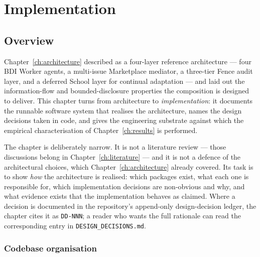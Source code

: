 \chapter{Implementation}
\label{ch:implementation}

\section{Overview}
\label{sec:impl-overview}

Chapter~\ref{ch:architecture} described \NEXUS{} as a four-layer
reference architecture --- four BDI Worker agents, a multi-issue
Marketplace mediator, a three-tier Fence audit layer, and a deferred
School layer for continual adaptation --- and laid out the
information-flow and bounded-disclosure properties the composition is
designed to deliver. This chapter turns from architecture to
\emph{implementation}: it documents the runnable software system that
realises the architecture, names the design decisions taken in code,
and gives the engineering substrate against which the empirical
characterisation of Chapter~\ref{ch:results} is performed.

The chapter is deliberately narrow. It is not a literature review ---
those discussions belong in Chapter~\ref{ch:literature} --- and it is
not a defence of the architectural choices, which Chapter~\ref{ch:architecture}
already covered. Its task is to show \emph{how} the architecture is
realised: which packages exist, what each one is responsible for, which
implementation decisions are non-obvious and why, and what evidence
exists that the implementation behaves as claimed. Where a decision is
documented in the repository's append-only design-decision ledger, the
chapter cites it as \texttt{DD-NNN}; a reader who wants the full
rationale can read the corresponding entry in \texttt{DESIGN\_DECISIONS.md}.

\subsection{Codebase organisation}
\label{subsec:impl-codebase}

